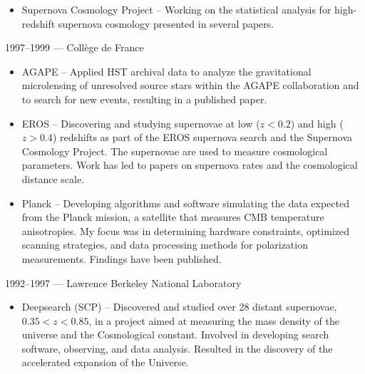 \documentclass[line, margin]{res}
\begin{document}
\begin{resume}
\begin{itemize}
\item Supernova Cosmology Project -- Working on the statistical analysis for high-redshift supernova cosmology presented in
several papers.
\end{itemize}
1997--1999 --- Coll\`ege de France
\begin{itemize}
\item AGAPE -- Applied
 HST archival data to analyze the gravitational microlensing of unresolved
source stars within the AGAPE collaboration and to search for new events,  resulting in a published paper.
\item EROS -- Discovering and studying supernovae at low ($z<0.2$) and high ($z > 0.4$)
redshifts as part of the EROS supernova search and the Supernova Cosmology
Project.  The supernovae are used to measure cosmological parameters. Work has led to papers on
supernova rates and the cosmological distance scale.
\item Planck -- Developing algorithms and software simulating the data expected from
the Planck mission, a satellite that measures CMB temperature
anisotropies.  My focus was in determining hardware constraints, optimized scanning strategies, and data processing
methods for polarization measurements. Findings have been published.
\end{itemize}
1992--1997 --- Lawrence Berkeley National Laboratory
\begin{itemize}
\item Deepsearch (SCP) -- Discovered and studied over 28 distant supernovae, $0.35< z < 0.85$, in a
 project aimed at measuring the mass density of the universe and the
 Cosmological constant.  Involved in developing search software, observing,
 and data analysis.  Resulted in the discovery of the accelerated expansion of the Universe.
\end{itemize}


\end{resume}
\end{document}
